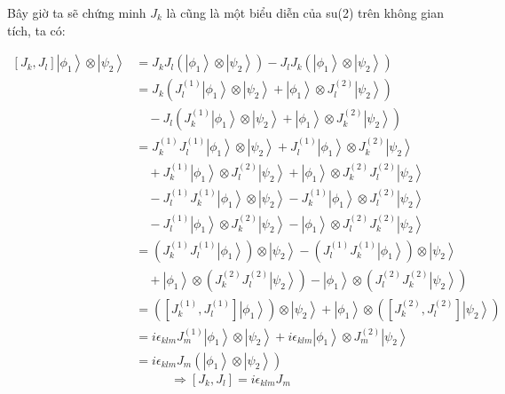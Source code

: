 \documentclass{report}
\begin{document}
Bây giờ ta sẽ chứng minh \( J_{k} \) là cũng là một biểu diễn của su(2) trên không gian tích, ta có:

	\begin{align*}
		\left[ J_{k}, J_{l} \right]  \left| \phi_{1} \right\rangle \otimes \left| \psi_{2} \right\rangle & = J_{k} J_{l}  \left( \left| \phi_{1} \right\rangle \otimes \left| \psi_{2} \right\rangle \right) - J_{l} J_{k}  \left( \left| \phi_{1} \right\rangle \otimes \left| \psi_{2} \right\rangle \right) \\
		& = J_{k} \left( J_{l}^{(1)} \left| \phi_{1} \right\rangle \otimes \left| \psi_{2} \right\rangle + \left| \phi_{1} \right\rangle \otimes J_{l}^{(2)} \left| \psi_{2} \right\rangle \right) \\
		& \quad - J_{l} \left( J_{k}^{(1)} \left| \phi_{1} \right\rangle \otimes \left| \psi_{2} \right\rangle + \left| \phi_{1} \right\rangle \otimes J_{k}^{(2)} \left| \psi_{2} \right\rangle \right) \\
		& = J_{k}^{(1)} J_{l}^{(1)} \left| \phi_{1} \right\rangle \otimes \left| \psi_{2} \right\rangle + J_{l}^{(1)} \left| \phi_{1} \right\rangle \otimes J_{k}^{(2)} \left| \psi_{2} \right\rangle \\
		& \quad + J_{k}^{(1)} \left| \phi_{1} \right\rangle \otimes J_{l}^{(2)} \left| \psi_{2} \right\rangle + \left| \phi_{1} \right\rangle \otimes J_{k}^{(2)} J_{l}^{(2)} \left| \psi_{2} \right\rangle \\
		& \quad - J_{l}^{(1)} J_{k}^{(1)} \left| \phi_{1} \right\rangle \otimes \left| \psi_{2} \right\rangle - J_{k}^{(1)} \left| \phi_{1} \right\rangle \otimes J_{l}^{(2)} \left| \psi_{2} \right\rangle \\
		& \quad - J_{l}^{(1)} \left| \phi_{1} \right\rangle \otimes J_{k}^{(2)} \left| \psi_{2} \right\rangle - \left| \phi_{1} \right\rangle \otimes J_{l}^{(2)} J_{k}^{(2)} \left| \psi_{2} \right\rangle \\
		& = \left( J_{k}^{(1)} J_{l}^{(1)} \left| \phi_{1} \right\rangle \right) \otimes \left| \psi_{2} \right\rangle - \left( J_{l}^{(1)} J_{k}^{(1)} \left| \phi_{1} \right\rangle \right) \otimes \left| \psi_{2} \right\rangle \\
		& \quad + \left| \phi_{1} \right\rangle \otimes \left( J_{k}^{(2)} J_{l}^{(2)} \left| \psi_{2} \right\rangle \right) - \left| \phi_{1} \right\rangle \otimes \left( J_{l}^{(2)} J_{k}^{(2)} \left| \psi_{2} \right\rangle \right) \\
		& = \left( \left[ J_{k}^{(1)}, J_{l}^{(1)} \right] \left| \phi_{1} \right\rangle \right) \otimes \left| \psi_{2} \right\rangle +  \left| \phi_{1} \right\rangle \otimes \left( \left[ J_{k}^{(2)}, J_{l}^{(2)} \right] \left| \psi_{2} \right\rangle \right) \\
		& = i \epsilon _{klm} J_{m}^{(1)} \left| \phi_{1} \right\rangle \otimes \left| \psi_{2} \right\rangle + i \epsilon _{klm} \left| \phi_{1} \right\rangle \otimes J_{m}^{(2)} \left| \psi_{2} \right\rangle \\
		& = i \epsilon _{klm} J_{m} \left( \left| \phi_{1} \right\rangle \otimes \left| \psi_{2} \right\rangle \right)
	\end{align*}
\[ \Rightarrow \left[ J_{k}, J_{l} \right] =  i \epsilon _{klm} J_{m} \]
 
\end{document}

